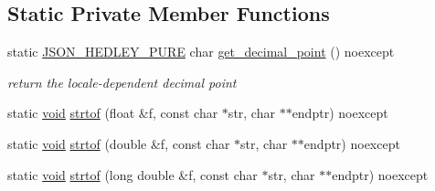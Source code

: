 \subsection*{Static Private Member Functions}
\begin{DoxyCompactItemize}
\item 
static \hyperlink{json_8hpp_af5c84b7d1a43361bdc14cc6941078000}{J\+S\+O\+N\+\_\+\+H\+E\+D\+L\+E\+Y\+\_\+\+P\+U\+RE} char \hyperlink{classnlohmann_1_1detail_1_1lexer_a48f74c761ce663cd0d92bf428606b535}{get\+\_\+decimal\+\_\+point} () noexcept
\begin{DoxyCompactList}\small\item\em return the locale-\/dependent decimal point \end{DoxyCompactList}\item 
static \hyperlink{namespacenlohmann_1_1detail_a59fca69799f6b9e366710cb9043aa77d}{void} \hyperlink{classnlohmann_1_1detail_1_1lexer_a6d3dffb7bb247a7fd7276d49d3a00dc8}{strtof} (float \&f, const char $\ast$str, char $\ast$$\ast$endptr) noexcept
\item 
static \hyperlink{namespacenlohmann_1_1detail_a59fca69799f6b9e366710cb9043aa77d}{void} \hyperlink{classnlohmann_1_1detail_1_1lexer_ac8455259d8a06acd2a284a5dd7221aea}{strtof} (double \&f, const char $\ast$str, char $\ast$$\ast$endptr) noexcept
\item 
static \hyperlink{namespacenlohmann_1_1detail_a59fca69799f6b9e366710cb9043aa77d}{void} \hyperlink{classnlohmann_1_1detail_1_1lexer_ae01f87db7819a05d0ed17bcb665442e1}{strtof} (long double \&f, const char $\ast$str, char $\ast$$\ast$endptr) noexcept
\end{DoxyCompactItemize}
